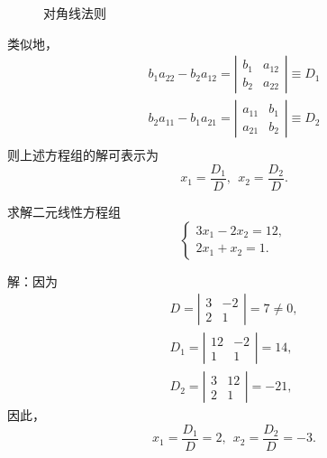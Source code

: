 \documentclass[10pt,a4paper%
tablecaptionabove]{article}
\begin{document}
\begin{CJK}{UTF8}{gkai}
  \begin{figure}[htbp]
    \centering      
    \caption{对角线法则}
  \end{figure}

  
  类似地，
  $$
  \begin{array}{l}
    b_1 a_{22} - b_2 a_{12} = \left|
    \begin{array}{cc}
      b_1 & a_{12} \\
      b_2 & a_{22} 
    \end{array}
            \right|  \equiv D_1\\[0.4cm]
    b_2 a_{11} - b_1 a_{21} = \left|
    \begin{array}{cc}
      a_{11} & b_1 \\
      a_{21} & b_2
    \end{array}
               \right|  \equiv D_2\\
  \end{array}
  $$      
  则上述方程组的解可表示为
  $$
  x_1 = \frac{D_1}{D},\ \
  x_2 = \frac{D_2}{D}.
  $$

  \begin{li}
    求解二元线性方程组
    $$
    \left\{
      \begin{array}{l}
        3x_1 - 2x_2 = 12, \\[0.2cm]
        2x_1 + x_2  = 1.
      \end{array}
    \right.
    $$
  \end{li}
  解：因为
  $$
  \begin{array}{l}
    D = \left|
    \begin{array}{cc}
      3 & -2 \\
      2 & 1 
    \end{array}
          \right| = 7 \ne 0,\\[0.4cm]
    D_1 = \left|
    \begin{array}{cc}
      12 & -2 \\
      1 & 1 
    \end{array}
          \right| = 14 , \\[0.4cm]
    D_2 = \left|
    \begin{array}{cc}
      3 & 12 \\
      2 & 1 
    \end{array}
          \right| = -21,
  \end{array}
  $$
  因此，
  $$
  x_1=\frac{D_1}{D}=2, \ \ x_2 = \frac{D_2}{D} = -3.
  $$


\end{CJK}
\end{document}
